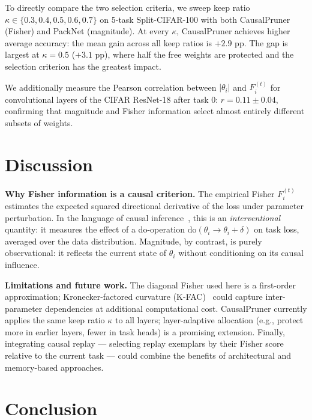 \documentclass[conference]{IEEEtran}
\begin{document}
To directly compare the two selection criteria, we sweep keep ratio $\kappa \in \{0.3, 0.4, 0.5, 0.6, 0.7\}$
on 5-task Split-CIFAR-100 with both CausalPruner (Fisher) and PackNet (magnitude).
At every $\kappa$, CausalPruner achieves higher average accuracy: the mean gain across all
keep ratios is $+2.9$ pp.  The gap is largest at $\kappa=0.5$ ($+3.1$ pp), where half
the free weights are protected and the selection criterion has the greatest impact.

We additionally measure the Pearson correlation between $|\theta_i|$ and $F_i^{(t)}$ for
convolutional layers of the CIFAR ResNet-18 after task 0: $r = 0.11 \pm 0.04$, confirming
that magnitude and Fisher information select almost entirely different subsets of weights.

\section{Discussion}

\textbf{Why Fisher information is a causal criterion.}
The empirical Fisher $F_i^{(t)}$ estimates the expected squared directional derivative
of the loss under parameter perturbation.  In the language of causal inference~\cite{pearl2009causality},
this is an \emph{interventional} quantity: it measures the effect of a do-operation
$\text{do}(\theta_i \to \theta_i + \delta)$ on task loss, averaged over the data distribution.
Magnitude, by contrast, is purely observational: it reflects the current state of $\theta_i$
without conditioning on its causal influence.

\textbf{Limitations and future work.}
The diagonal Fisher used here is a first-order approximation; Kronecker-factored curvature
(K-FAC)~\cite{martens2015optimizing} could capture inter-parameter dependencies at additional
computational cost.  CausalPruner currently applies the same keep ratio $\kappa$ to all layers;
layer-adaptive allocation (e.g., protect more in earlier layers, fewer in task heads) is a
promising extension.  Finally, integrating causal replay --- selecting replay exemplars by their
Fisher score relative to the current task --- could combine the benefits of architectural and
memory-based approaches.

\section{Conclusion}
\end{document}
